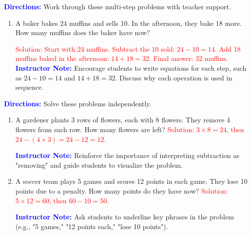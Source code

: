 \documentclass[27.26.36148pt]{article}
\begin{document}
\vspace{2cm}

\begin{tcolorbox}[colframe=black!60, colback=white, 
coltitle=black, colbacktitle=black!15, fonttitle=\bfseries\Large, 
title=Guided Practice, halign title=center, left=10pt, right=10pt, top=10pt, bottom=60pt]
\textcolor{blue}{\textbf{Directions:}} Work through these multi-step problems with teacher support.

\begin{enumerate}[itemsep=1em]
    \item A baker bakes 24 muffins and sells 10. In the afternoon, they bake 18 more. How many muffins does the baker have now? 

    \textcolor{red}{Solution: Start with 24 muffins. Subtract the 10 sold: \( 24 - 10 = 14 \). Add 18 muffins baked in the afternoon: \( 14 + 18 = 32 \). Final answer: 32 muffins.}
    \textcolor{blue}{\textbf{Instructor Note:}} Encourage students to write equations for each step, such as \( 24 - 10 = 14 \) and \( 14 + 18 = 32 \). Discuss why each operation is used in sequence.
\end{enumerate}
\end{tcolorbox}

\vspace{2cm}

\begin{tcolorbox}[colframe=black!60, colback=white, 
coltitle=black, colbacktitle=black!15, fonttitle=\bfseries\Large, 
title=Independent Practice, halign title=center, left=10pt, right=10pt, top=10pt, bottom=60pt]
\textcolor{blue}{\textbf{Directions:}} Solve these problems independently.

\begin{enumerate}[itemsep=1em]
    \item A gardener plants 3 rows of flowers, each with 8 flowers. They remove 4 flowers from each row. How many flowers are left? \textcolor{red}{Solution: \( 3 \times 8 = 24 \), then \( 24 - (4 \times 3) = 24 - 12 = 12 \).}

    \textcolor{blue}{\textbf{Instructor Note:}} Reinforce the importance of interpreting subtraction as "removing" and guide students to visualize the problem.

    \item A soccer team plays 5 games and scores 12 points in each game. They lose 10 points due to a penalty. How many points do they have now? \textcolor{red}{Solution: \( 5 \times 12 = 60 \), then \( 60 - 10 = 50 \).}

    \textcolor{blue}{\textbf{Instructor Note:}} Ask students to underline key phrases in the problem (e.g., "5 games," "12 points each," "lose 10 points").
\end{enumerate}
\end{tcolorbox}
\end{document}
